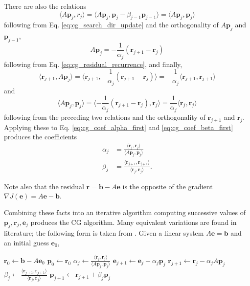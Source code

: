 \documentclass[utf8,english]{gradu3}
\begin{document}
There are also the relations
\[
  \langle A\mathbf{p}_j, r_j \rangle
  = \langle A\mathbf{p}_j, \mathbf{p}_j - \beta_{j-1} \mathbf{p}_{j-1} \rangle
  = \langle A\mathbf{p}_j, \mathbf{p}_j \rangle
\]
following from Eq. \eqref{eq:cg_search_dir_update}
and the orthogonality of $A\mathbf{p}_j$ and $\mathbf{p}_{j-1}$,
\[
  A\mathbf{p}_j = -\frac{1}{\alpha_j}(\mathbf{r}_{j+1} - \mathbf{r}_j)
\]
following from Eq. \eqref{eq:cg_residual_recurrence},
and finally,
\[
  \langle \mathbf{r}_{j+1}, A\mathbf{p}_j \rangle
  = \langle \mathbf{r}_{j+1}, -\frac{1}{\alpha_j}(\mathbf{r}_{j+1} - \mathbf{r}_j) \rangle
  = -\frac{1}{\alpha_j} \langle \mathbf{r}_{j+1}, \mathbf{r}_{j+1} \rangle
\]
and
\[
  \langle A\mathbf{p}_j, \mathbf{p}_j \rangle 
  = \langle -\frac{1}{\alpha_j}(\mathbf{r}_{j+1} - \mathbf{r}_j), \mathbf{r}_j \rangle
  = \frac{1}{\alpha_j} \langle \mathbf{r}_j, \mathbf{r}_j \rangle
\]
following from the preceding two relations and the orthogonality of
$\mathbf{r}_{j+1}$ and $\mathbf{r}_j$.
Applying these to Eq. \eqref{eq:cg_coef_alpha_first}
and \eqref{eq:cg_coef_beta_first} produces the coefficients
\begin{align}
  \label{eq:cg_coef_alpha_final}
  \alpha_j &= \frac{\langle \mathbf{r}_j, \mathbf{r}_j \rangle}
    {\langle A\mathbf{p}_j, \mathbf{p}_j\rangle} \\
  \label{eq:cg_coef_beta_final}
  \beta_j &= \frac{\langle \mathbf{r}_{j+1}, \mathbf{r}_{j+1} \rangle}
    {\langle \mathbf{r}_j, \mathbf{r}_j \rangle}.
\end{align}

Note also that the residual $\mathbf{r} = \mathbf{b} - A\mathbf{e}$
is the opposite of the gradient $\nabla J(\mathbf{e}) = A\mathbf{e} - \mathbf{b}$.

Combining these facts into an iterative algorithm
computing successive values of $\mathbf{p}_j,\mathbf{r}_j,\mathbf{e}_j$ produces the CG algorithm.
Many equivalent variations are found in literature;
the following form is taken from \textcite{saad_iterative_2003}.
Given a linear system $A\mathbf{e} = \mathbf{b}$ and an initial guess $\mathbf{e}_0$,

\begin{algorithmic}[1]
  \State $\mathbf{r}_0 \gets \mathbf{b} - A\mathbf{e}_0$ 
  \State $\mathbf{p}_0 \gets \mathbf{r}_0$ 
    \State $\alpha_j \gets \frac{\langle \mathbf{r}_j, \mathbf{r}_j \rangle}
        {\langle A\mathbf{p}_j, \mathbf{p}_j\rangle}$
    \State $\mathbf{e}_{j+1} \gets \mathbf{e}_j + \alpha_j \mathbf{p}_j$
    \State $\mathbf{r}_{j+1} \gets \mathbf{r}_j - \alpha_j A\mathbf{p}_j$
    \State $\beta_j \gets \frac{\langle \mathbf{r}_{j+1}, \mathbf{r}_{j+1} \rangle}
        {\langle \mathbf{r}_j, \mathbf{r}_j \rangle}$
    \State $\mathbf{p}_{j+1} \gets \mathbf{r}_{j+1} + \beta_j \mathbf{p}_j$
  \EndFor
\end{algorithmic}
\end{document}
